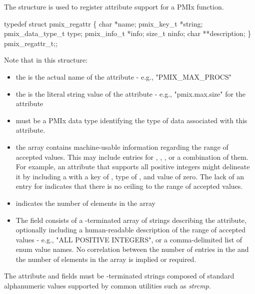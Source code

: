 The  structure is used to register attribute support for a \ac{PMIx} function.

\cspecificstart
\begin{codepar}
typedef struct pmix_regattr \{
    char *name;
    pmix_key_t *string;
    pmix_data_type_t type;
    pmix_info_t *info;
    size_t ninfo;
    char **description;
\} pmix_regattr_t;;
\end{codepar}
\cspecificend

Note that in this structure:

\begin{itemize}
    \item the  is the actual name of the attribute - e.g., "PMIX_MAX_PROCS"
    \item the  is the literal string value of the attribute - e.g., "pmix.max.size" for the  attribute
    \item {} must be a \ac{PMIx} data type identifying the type of data associated with this attribute.
    \item the  array contains machine-usable information regarding the range of accepted values. This may include entries for , , , or a combination of them. For example, an attribute that supports all positive integers might delineate it by including a  with a key of , type of , and value of zero. The lack of an entry for  indicates that there is no ceiling to the range of accepted values.
    \item {} indicates the number of elements in the  array
    \item The  field consists of a -terminated array of strings describing the attribute, optionally including a human-readable description of the range of accepted values - e.g., "ALL POSITIVE INTEGERS", or a comma-delimited list of enum value names. No correlation between the number of entries in the  and the number of elements in the  array is implied or required.
\end{itemize}

The attribute  and  fields must be -terminated strings composed of standard alphanumeric values supported by common utilities such as \textit{strcmp}.

